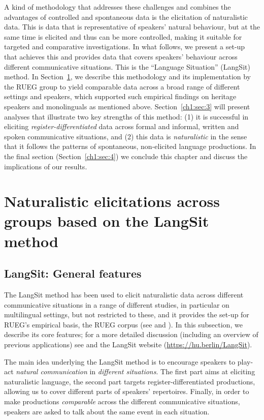 \documentclass[output=paper,colorlinks,citecolor=brown]{langscibook}
\begin{document}
A kind of methodology that addresses these challenges and combines the advantages of controlled and spontaneous data is the elicitation of naturalistic data. This is data that is representative of speakers’ natural behaviour, but at the same time is elicited and thus can be more controlled, making it suitable for targeted and comparative investigations. In what follows, we present a set-up that achieves this and provides data that covers speakers’ behaviour across different communicative situations. This is the “Language Situation” (LangSit) method. In Section~\ref{ch1:sec:2}, we describe this methodology and its implementation by the RUEG group to yield comparable data across a broad range of different settings and speakers, which supported such empirical findings on heritage speakers and monolinguals as mentioned above. Section~\ref{ch1:sec:3} will present analyses that illustrate two key strengths of this method: (1) it is successful in eliciting \textit{register-differentiated} data across formal and informal, written and spoken communicative situations, and (2) this data is \textit{naturalistic} in the sense that it follows the patterns of spontaneous, non-elicited language productions. In the final section (Section~\ref{ch1:sec:4}) we conclude this chapter and discuss the implications of our results.

\section{Naturalistic elicitations across groups based on the LangSit method}\label{ch1:sec:2}
\subsection{LangSit: General features}\label{ch1:sec:2.1}
The LangSit method has been used to elicit naturalistic data across different communicative situations in a range of different studies, in particular on multilingual settings, but not restricted to these, and it provides the set-up for RUEG’s empirical basis, the RUEG corpus (see  and \cite{Klotzetal2024}). In this subsection, we describe its core features; for a more detailed discussion (including an overview of previous applications) see \citet{wiese2020} and the LangSit website (\url{https://hu.berlin/LangSit}). 

The main idea underlying the LangSit method is to encourage speakers to play-act \textit{natural communication} in \textit{different situations}. The first part aims at eliciting naturalistic language, the second part targets register-differentiated productions, allowing us to cover different parts of speakers’ repertoires. Finally, in order to make productions \textit{comparable} across the different communicative situations, speakers are asked to talk about the same event in each situation.
\end{document}
